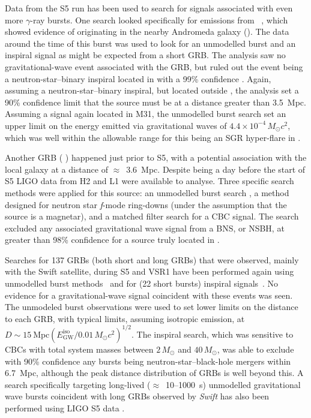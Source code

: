 Data from the S5 run has been used to search for signals associated with even more $\gamma$-ray bursts. One 
search looked specifically for emissions from ~\cite{Golenetskii:2007a, 
Golenetskii:2007b}, which showed evidence of originating in the nearby Andromeda galaxy (). 
The data around the time of this burst was used to look for an unmodelled burst and an inspiral signal as 
might be expected from a short GRB. The analysis saw no gravitational-wave event associated with the GRB, but 
ruled out the event being a neutron-star--binary inspiral located in  with a 99\% confidence
\cite{Abbott:2008g}. Again, assuming a neutron-star--binary inspiral, but located outside , 
the analysis set a 90\% confidence limit that the source must be at a distance greater than 3.5~Mpc. Assuming 
a signal again located in M31, the unmodelled burst search set an upper limit on the energy emitted via
gravitational waves of $4.4\times10^{-4}\,M_{\odot}c^2$, which was well within the allowable range for this 
being an SGR hyper-flare in .

Another GRB ( \cite{2005GCN..4197....1G}) happened just prior to S5, with a 
potential association with the local galaxy  at a distance of $\approx$~3.6~Mpc. 
Despite being a day before the start of S5 LIGO data from H2 and L1 were available to analyse. Three specific 
search methods were applied for this source: an unmodelled burst search \cite{2010NJPh...12e3034S}, a method 
designed for neutron star \textit{f}-mode ring-downs \cite{2007CQGra..24S.659K} (under the assumption that 
the source is a magnetar), and a matched filter search for a CBC signal. The search excluded any associated
gravitational wave signal from a BNS, or NSBH, at greater than 98\% confidence for a source truly located in 
.

Searches for 137 GRBs (both short and long GRBs) that were observed, mainly with the Swift satellite, during 
S5 and VSR1 have been performed again using unmodelled burst methods~\cite{Abbott:2009d} and for (22 short 
bursts) inspiral signals~\cite{Abadie:2010b}. No evidence for a gravitational-wave signal coincident with 
these events was seen. The unmodeled burst observations were used to set lower limits on the distance to each 
GRB, with typical limits, assuming isotropic emission, at
$D\sim15\mathrm{\ Mpc}(E^{\mathrm{iso}}_{\mathrm{GW}}/0.01\,M_{\odot}c^2)^{1/2}$. The inspiral search, which 
was sensitive to CBCs with total system masses between $2\,M_{\odot}$ and $40\,M_{\odot}$, was able to 
exclude with 90\% confidence any bursts being neutron-star--black-hole mergers within 6.7~Mpc, although the 
peak distance distribution of GRBs is well beyond this. A search specifically targeting long-lived 
($\approx$~10--1000~s) unmodelled gravitational wave bursts coincident with long GRBs observed by 
\textit{Swift} has also been performed using LIGO S5 data \cite{2013PhRvD..88l2004A}.

